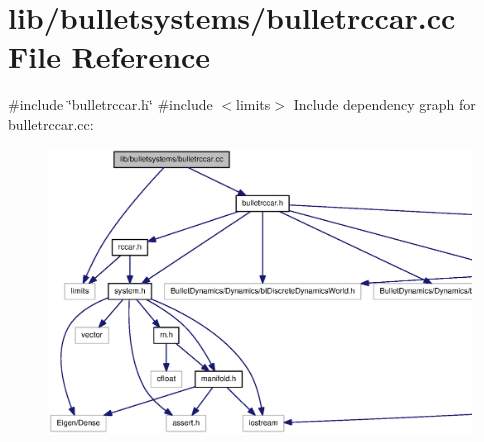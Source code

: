 \section{lib/bulletsystems/bulletrccar.cc \-File \-Reference}
\label{bulletrccar_8cc}
{\ttfamily \#include \char`\"{}bulletrccar.\-h\char`\"{}}\*
{\ttfamily \#include $<$limits$>$}\*
\-Include dependency graph for bulletrccar.\-cc\-:
\nopagebreak
\begin{figure}[H]
\begin{center}
\leavevmode
\includegraphics[width=350pt]{bulletrccar_8cc__incl}
\end{center}
\end{figure}

